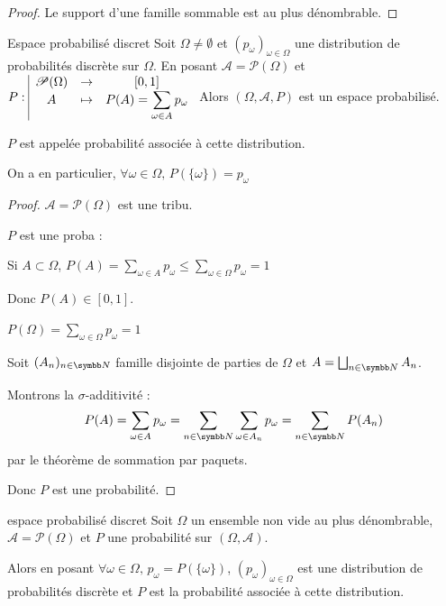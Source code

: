 \begin{proof}
    Le support d'une famille sommable est au plus dénombrable.
\end{proof}

\begin{theoreme}{Espace probabilisé discret}{}
    Soit $\Omega \neq \emptyset$ et $(p_\omega)_{\omega \in \Omega}$ une distribution de probabilités discrète
    sur $\Omega$. En posant $\mathcal A = \mathscr P(\Omega)$ et
    $P: \space \begin{array}{|ccc} \displaystyle \mathscr P(\Omega) & \to & \displaystyle [0, 1] \\ \displaystyle A & \mapsto & \displaystyle P(A) = \sum_{\omega \in A} p_\omega  \end{array}$
    Alors $(\Omega, \mathcal A, P)$ est un espace probabilisé.

    $P$ est appelée probabilité associée à cette distribution. 
\end{theoreme}

\begin{remarque}
    On a en particulier, $\forall \omega \in \Omega, \, P(\{\omega\}) = p_\omega$
\end{remarque}

\begin{proof}
    $\mathcal A = \mathscr P(\Omega)$ est une tribu.

    $P$ est une proba : 

    Si $A \subset \Omega$, $P(A) = \sum_{\omega \in A} p_\omega \leqslant \sum_{\omega \in \Omega} p_\omega = 1$

    Donc $P(A) \in [0, 1]$.

    $\displaystyle P(\Omega) = \sum_{\omega \in \Omega} p_\omega = 1$

    Soit $(A_n)_{n \in \N}$ famille disjointe de parties de $\Omega$ et $A = \bigsqcup_{n \in \N} A_n$.

    Montrons la $\sigma$-additivité :
    $$ P(A) = \sum_{\omega \in A} p_\omega = \sum_{n \in \N} \sum_{\omega \in A_n} p_\omega = \sum_{n \in \N} P(A_n) $$
    par le théorème de sommation par paquets.

    Donc $P$ est une probabilité.
\end{proof}

\begin{theorement}{espace probabilisé discret}{}
    Soit $\Omega$ un ensemble non vide au plus dénombrable,
    $\mathcal A = \mathscr P(\Omega)$ et $P$ une probabilité sur $(\Omega, \mathcal A)$.

    Alors en posant $\forall \omega \in \Omega, \, p_\omega = P(\{\omega\})$,
    $(p_\omega)_{\omega \in \Omega}$ est une distribution de probabilités discrète 
    et $P$ est la probabilité associée à cette distribution.
\end{theorement}

